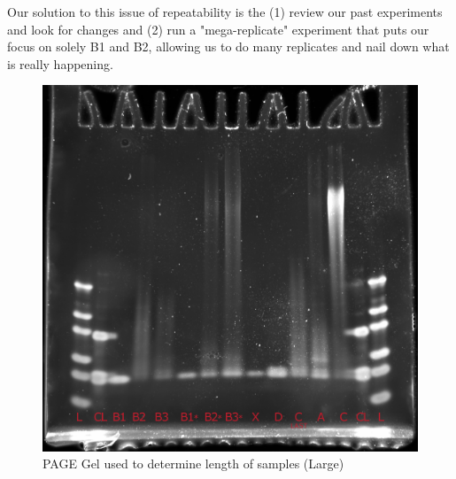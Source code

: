\documentclass{ssiBio}
\begin{document}
Our solution to this issue of repeatability is the (1) review our past experiments and look for changes and (2) run a "mega-replicate" experiment that puts our focus on solely B1 and B2, allowing us to do many replicates and nail down what is really happening.

\begin{figure}[ht]
	\begin{center}
		\includegraphics[width=.95\textwidth]{./resources/gels/labeled.png}
		\caption{PAGE Gel used to determine length of samples (Large)}
		\label{mainGel-big}
	\end{center}
\end{figure}


\end{document}
